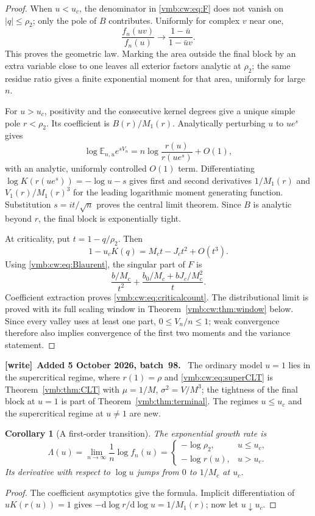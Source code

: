 \documentclass[11pt,a4paper]{article}
\numberwithin{equation}{section}
\newtheorem{corollary}[theorem]{Corollary}
\theoremstyle{definition}\newtheorem{definition}[theorem]{Definition}
\theoremstyle{remark}\newtheorem{remark}[theorem]{Remark}
\newcommand{\E}{\mathbb E}
\newcommand{\dd}{\mathrm d}
\newenvironment{writenote}[1][]{\par\smallskip\begingroup\small
 \noindent\textbf{[write]}\if\relax\detokenize{#1}\relax\else~\textbf{#1.}\fi\ }%
 {\par\endgroup\smallskip}
\begin{document}
\begin{proof}
When $u<u_c$, the denominator in \eqref{vmb:cw:eq:F} does not vanish on
$|q|\le\rho_2$; only the pole of $B$ contributes. Uniformly for complex $v$
near one,
\[
 \frac{f_n(uv)}{f_n(u)}\longrightarrow\frac{1-\bar u}{1-\bar uv}.
\]
This proves the geometric law. Marking the area outside the final block
by an extra variable close to one leaves all exterior factors analytic at
$\rho_2$; the same residue ratio gives a finite exponential moment for that
area, uniformly for large $n$.

For $u>u_c$, positivity and the consecutive kernel degrees give a unique
simple pole $r<\rho_2$. Its coefficient is $B(r)/M_1(r)$. Analytically
perturbing $u$ to $ue^s$ gives
\[
 \log\E_{n,u}e^{sV_n}
 =n\log\frac{r(u)}{r(ue^s)}+O(1),
\]
with an analytic, uniformly controlled $O(1)$ term. Differentiating
$\log K(r(ue^s))=-\log u-s$ gives first and second derivatives
$1/M_1(r)$ and $V_1(r)/M_1(r)^3$ for the leading logarithmic moment
generating function. Substitution $s=it/\sqrt n$ proves the central limit
theorem. Since $B$ is analytic beyond $r$, the final block is exponentially
tight.

At criticality, put $t=1-q/\rho_2$. Then
\[
 1-u_cK(q)=M_ct-J_ct^2+O(t^3).
\]
Using \eqref{vmb:cw:eq:Blaurent}, the singular part of $F$ is
\[
 \frac{b/M_c}{t^2}+\frac{b_0/M_c+bJ_c/M_c^2}{t}.
\]
Coefficient extraction proves \eqref{vmb:cw:eq:criticalcount}. The distributional
limit is proved with its full scaling window in Theorem~\ref{vmb:cw:thm:window}
below. Since every valley uses at least one part, $0\le V_n/n\le1$;
weak convergence therefore also implies convergence of the first two
moments and the variance statement.
\end{proof}

\begin{writenote}[Added 5 October 2026, batch~98]
The ordinary model $u=1$ lies in the supercritical regime, where
$r(1)=\rho$ and \eqref{vmb:cw:eq:superCLT} is Theorem~\ref{vmb:thm:CLT} with
$\mu=1/M$, $\sigma^2=V/M^3$; the tightness of the final block at $u=1$ is
part of Theorem~\ref{vmb:thm:terminal}. The regimes $u\le u_c$ and the
supercritical regime at $u\ne1$ are new.
\end{writenote}

\begin{corollary}[A first-order transition]\label{vmb:cw:cor:firstorder}
The exponential growth rate is
\begin{equation}
 \Lambda(u)=\lim_{n\to\infty}\frac1n\log f_n(u)
 =\begin{cases}-\log \rho_2,&u\le u_c,\\-\log r(u),&u>u_c.
 \end{cases}
\end{equation}
Its derivative with respect to $\log u$ jumps from $0$ to $1/M_c$ at $u_c$.
\end{corollary}
\begin{proof}
The coefficient asymptotics give the formula. Implicit differentiation of
$uK(r(u))=1$ gives $-\dd\log r/\dd\log u=1/M_1(r)$; now let $u\downarrow u_c$.
\end{proof}
\end{document}
